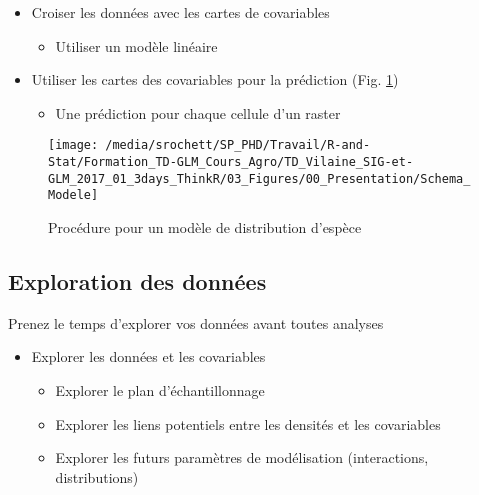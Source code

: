 \documentclass[french,a4paper]{article}
\providecommand{\tightlist}{%
  \setlength{\itemsep}{0pt}\setlength{\parskip}{0pt}}
\begin{document}
\begin{itemize}
\tightlist
\item
  Croiser les données avec les cartes de covariables

  \begin{itemize}
  \tightlist
  \item
    Utiliser un modèle linéaire
  \end{itemize}
\item
  Utiliser les cartes des covariables pour la prédiction (Fig.
  \ref{fig:figProcedure})

  \begin{itemize}
  \tightlist
  \item
    Une prédiction pour chaque cellule d'un raster
  \end{itemize}
\end{itemize}



\begin{figure}[!h]

{\centering \texttt{[image: /media/srochett/SP\_PHD/Travail/R-and-Stat/Formation\_TD-GLM\_Cours\_Agro/TD\_Vilaine\_SIG-et-GLM\_2017\_01\_3days\_ThinkR/03\_Figures/00\_Presentation/Schema\_Modele]} 

}

\caption{Procédure pour un modèle de distribution d'espèce}\label{fig:figProcedure}
\end{figure}

\hypertarget{exploration-des-donnees}{%
\subsection{Exploration des données}\label{exploration-des-donnees}}

\nopandoc{\begin{redbox}}

Prenez le temps d'explorer vos données avant toutes analyses
\nopandoc{\end{redbox}}

\begin{itemize}
\tightlist
\item
  Explorer les données et les covariables

  \begin{itemize}
  \tightlist
  \item
    Explorer le plan d'échantillonnage
  \item
    Explorer les liens potentiels entre les densités et les covariables
  \item
    Explorer les futurs paramètres de modélisation (interactions,
    distributions)
  \end{itemize}
\end{itemize}
\end{document}
